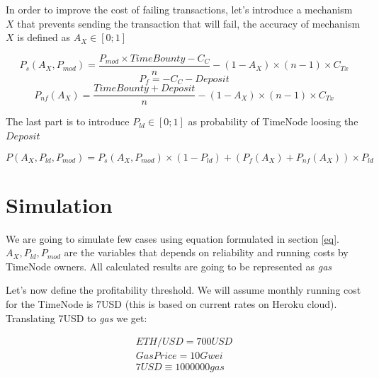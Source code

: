\documentclass{report}
\begin{document}
\begin{appendices}
  In order to improve the cost of failing transactions, let's introduce a mechanism $X$ that prevents sending the transaction that will fail, the accuracy of mechanism $X$ is defined as $A_{X} \in [0;1]$

  \[
  P_{s}(A_{X}, P_{mod})=\frac{P_{mod} \times TimeBounty-C_{C}}{n} - (1-A_{X}) \times (n-1) \times C_{Tx}
  \]
  \[
  P_{f}=-C_{C}-Deposit
  \]
  \[
  P_{nf}(A_{X})=\frac{TimeBounty+Deposit}{n} - (1-A_{X}) \times (n-1) \times C_{Tx}
  \]

  The last part is to introduce $P_{ld} \in [0;1]$ as probability of TimeNode loosing the $Deposit$


  \[
  \label{eq}
  P(A_{X}, P_{ld}, P_{mod})=P_{s}(A_{X}, P_{mod}) \times (1-P_{ld}) + (P_{f}(A_{X})+P_{nf}(A_{X})) \times P_{ld}
  \]
  \section{Simulation}
  We are going to simulate few cases using equation formulated in section \ref{eq}. $A_{X}, P_{ld}, P_{mod}$ are the variables that depends on reliability and running costs by TimeNode owners. All calculated results are going to be represented as \textit{gas}

  Let's now define the profitability threshold. We will assume monthly running cost for the TimeNode is 7USD (this is based on current rates on Heroku cloud). Translating 7USD to \textit{gas} we get:

  \begin{align*}
  ETH/USD=700USD\\
  Gas Price = 10Gwei\\
  7USD \equiv 1000000gas
  \end{align*}


\end{appendices}
\end{document}
